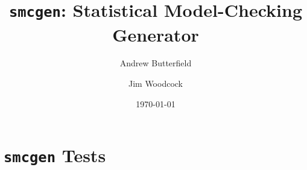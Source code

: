 \documentclass[fleqn,10pt]{report}
\author{
Andrew Butterfield \and Jim Woodcock
}
\title{
  \texttt{smcgen}:
  Statistical Model-Checking Generator
}
\date{
\today
}
\begin{document}
\maketitle
\tableofcontents
%

% 
%
%
% 
\newpage

\newpage

\newpage


\newpage


% 
\chapter{\texttt{smcgen} Tests}
%

%
%
% 



\end{document}
